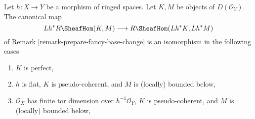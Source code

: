 \begin{lemma}
\label{lemma-pullback-internal-hom}
Let $h : X \to Y$ be a morphism of ringed spaces.
Let $K, M$ be objects of $D(\mathcal{O}_Y)$. The
canonical map
$$
Lh^*R\SheafHom(K, M) \longrightarrow R\SheafHom(Lh^*K, Lh^*M)
$$
of Remark \ref{remark-prepare-fancy-base-change}
is an isomorphism in the following cases
\begin{enumerate}
\item $K$ is perfect,
\item $h$ is flat, $K$ is pseudo-coherent, and $M$ is (locally) bounded below,
\item $\mathcal{O}_X$ has finite tor dimension over $h^{-1}\mathcal{O}_Y$,
$K$ is pseudo-coherent, and $M$ is (locally) bounded below,
\end{enumerate}
\end{lemma}

